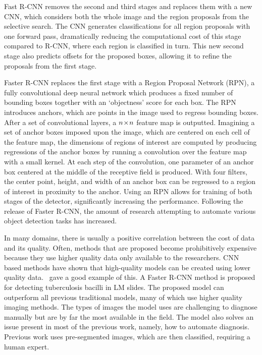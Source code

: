 Fast R-CNN removes the second and third stages and replaces them with a new CNN, which considers both the whole image and the region proposals from the selective search.
The CNN generates classifications for all region proposals with one forward pass, dramatically reducing the computational cost of this stage compared to R-CNN, where each region is classified in turn.
This new second stage also predicts offsets for the proposed boxes, allowing it to refine the proposals from the first stage.%

Faster R-CNN replaces the first stage with a Region Proposal Network (RPN), a fully convolutional deep neural network which produces a fixed number of bounding boxes together with an `objectness' score for each box.
The RPN introduces anchors, which are points in the image used to regress bounding boxes.
After a set of convolutional layers, a \(n\!\times \! n\) feature map is outputted.
Imagining a set of anchor boxes imposed upon the image, which are centered on each cell of the feature map, the dimensions of regions of interest are computed by producing regressions of the anchor boxes by running a convolution over the feature map with a small kernel.
At each step of the convolution, one parameter of an anchor box centered at the middle of the receptive field is produced.
With four filters, the center point, height, and width of an anchor box can be regressed to a region of interest in proximity to the anchor.
Using an RPN allows for training of both stages of the detector, significantly increasing the performance.
Following the release of Faster R-CNN, the amount of research attempting to automate various object detection tasks has increased.

In many domains, there is usually a positive correlation between the cost of data and its quality.
Often, methods that are proposed become prohibitively expensive because they use higher quality data only available to the researchers.
CNN based methods have shown that high-quality models can be created using lower quality data.\ \textcite{el_melegy_automatic_2019} gave a good example of this.
A Faster R-CNN method is proposed for detecting tuberculosis bacilli in LM slides.
The proposed model can outperform all previous traditional models, many of which use higher quality imaging methods.
The types of images the model uses are challenging to diagnose manually but are by far the most available in the field.
The model also solves an issue present in most of the previous work, namely, how to automate diagnosis.
Previous work uses pre-segmented images, which are then classified, requiring a human expert.

